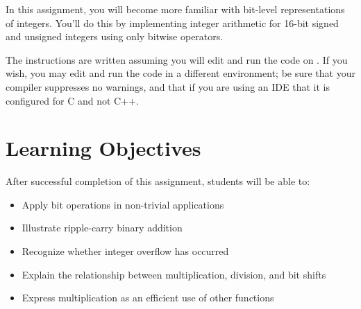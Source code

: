


\usepackage{cancel}

\renewcommand{\labnumber}{\integerlabnumber}
\renewcommand{\labname}{Integer Representation and Arithmetic Lab}
\renewcommand{\shortlabname}{integerlab}
\renewcommand{\collaborationrules}{\integerlabcollaboration}
\renewcommand{\duedate}{\integerlabdue}
\pagelayout

\labidentifier




In this assignment, you will become more familiar with bit-level
representations of integers.  You'll do this by implementing integer arithmetic
for 16-bit signed and unsigned integers using only bitwise operators.

The instructions are written assuming you will edit and run the code on
\runtimeenvironment. If you wish, you may edit and run the code
in a different environment; be sure that your compiler suppresses no warnings,
and that if you are using an IDE that it is configured for C and not C++.

\section*{Learning Objectives}

After successful completion of this assignment, students will be able to:
\begin{itemize}
\item Apply bit operations in non-trivial applications
\item Illustrate ripple-carry binary addition
\item Recognize whether integer overflow has occurred
\item Explain the relationship between multiplication, division, and bit shifts
\item Express multiplication as an efficient use of other functions

\end{itemize}


